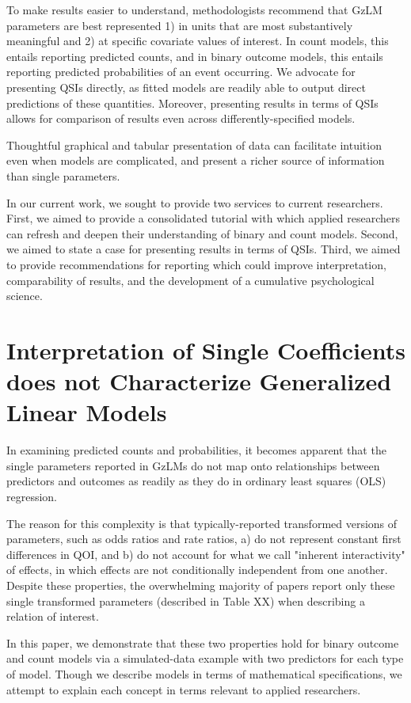 \documentclass[jou, apacite]{apa6}
\begin{document}
To make results easier to understand, methodologists recommend that GzLM parameters are best represented 1) in units that are most substantively meaningful and 2) at specific covariate values of interest.
In count models, this entails reporting predicted counts, and in binary outcome models, this entails reporting predicted probabilities of an event occurring. 
We advocate for presenting QSIs directly, as fitted models are readily able to output direct predictions of these quantities. 
Moreover, presenting results in terms of QSIs allows for comparison of results even across differently-specified models.

Thoughtful graphical and tabular presentation of data can facilitate intuition even when models are complicated, and present a richer source of information than single parameters. 

In our current work, we sought to provide two services to current researchers. First, we aimed to provide a consolidated tutorial with which applied researchers can refresh and deepen their understanding of binary and count models. Second, we aimed to state a case for presenting results in terms of QSIs. Third, we aimed to provide recommendations for reporting which could improve interpretation, comparability of results, and the development of a cumulative psychological science.

\section{Interpretation of Single Coefficients does not Characterize Generalized Linear Models}
In examining predicted counts and probabilities, it becomes apparent that the single parameters reported in GzLMs do not map onto relationships between predictors and outcomes as readily as they do in ordinary least squares (OLS) regression. 

The reason for this complexity is that typically-reported transformed versions of parameters, such as odds ratios and rate ratios, a) do not represent constant first differences in QOI, and b) do not account for what we call "inherent interactivity" of effects, in which effects are not conditionally independent from one another. 
Despite these properties, the overwhelming majority of papers report only these single transformed parameters (described in Table XX) when describing a relation of interest.

In this paper, we demonstrate that these two properties hold for binary outcome and count models via a simulated-data example with two predictors for each type of model. Though we describe models in terms of mathematical specifications, we attempt to explain each concept in terms relevant to applied researchers.
 
\end{document}

